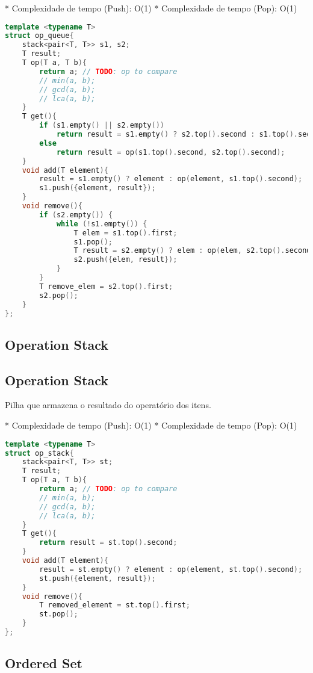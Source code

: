 \documentclass[11pt, a4paper, twoside]{article}
\begin{document}
* Complexidade de tempo (Push): O(1)
* Complexidade de tempo (Pop): O(1)

\begin{lstlisting}[language=C++]
template <typename T>
struct op_queue{
    stack<pair<T, T>> s1, s2;
    T result;
    T op(T a, T b){
        return a; // TODO: op to compare
        // min(a, b);
        // gcd(a, b);
        // lca(a, b);
    }
    T get(){
        if (s1.empty() || s2.empty()) 
            return result = s1.empty() ? s2.top().second : s1.top().second;
        else
            return result = op(s1.top().second, s2.top().second);
    }
    void add(T element){
        result = s1.empty() ? element : op(element, s1.top().second);
        s1.push({element, result});
    }
    void remove(){
        if (s2.empty()) {
            while (!s1.empty()) {
                T elem = s1.top().first;
                s1.pop();
                T result = s2.empty() ? elem : op(elem, s2.top().second);
                s2.push({elem, result});
            }
        }
        T remove_elem = s2.top().first;
        s2.pop();
    }
};
\end{lstlisting}

\subsection{Operation Stack}

\subsection{Operation Stack}



Pilha que armazena o resultado do operatório dos itens.

* Complexidade de tempo (Push): O(1)
* Complexidade de tempo (Pop): O(1)

\begin{lstlisting}[language=C++]
template <typename T>
struct op_stack{
    stack<pair<T, T>> st;
    T result;
    T op(T a, T b){
        return a; // TODO: op to compare
        // min(a, b);
        // gcd(a, b);
        // lca(a, b);
    }
    T get(){
        return result = st.top().second;
    }
    void add(T element){
        result = st.empty() ? element : op(element, st.top().second);
        st.push({element, result});
    }
    void remove(){
        T removed_element = st.top().first;
        st.pop();
    }
};
\end{lstlisting}

\subsection{Ordered Set}
\end{document}
